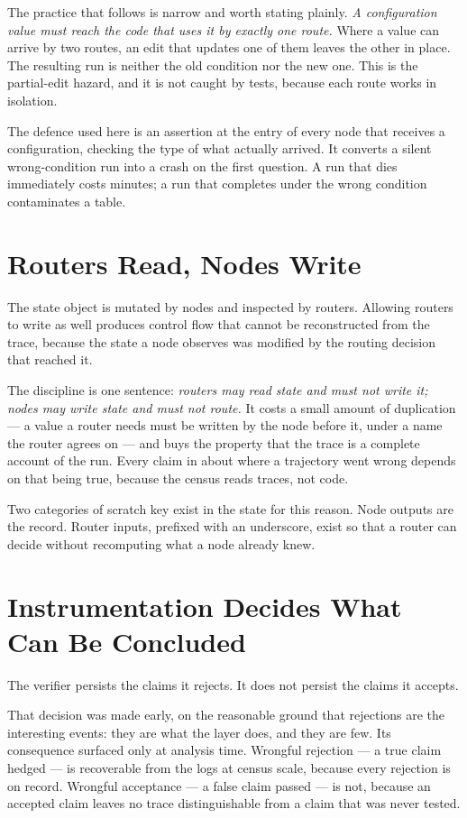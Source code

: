 The practice that follows is narrow and worth stating plainly. \emph{A
configuration value must reach the code that uses it by exactly one route.}
Where a value can arrive by two routes, an edit that updates one of them leaves
the other in place. The resulting run is neither the old condition nor the
new one. This is the partial-edit hazard, and it is not caught by tests, because
each route works in isolation.

The defence used here is an assertion at the entry of every node that receives a
configuration, checking the type of what actually arrived. It converts a silent
wrong-condition run into a crash on the first question. A run that dies
immediately costs minutes; a run that completes under the wrong condition
contaminates a table.

\section{Routers Read, Nodes Write}\label{app:state-discipline}

The state object is mutated by nodes and inspected by routers. Allowing routers
to write as well produces control flow that cannot be reconstructed from the
trace, because the state a node observes was modified by the routing decision
that reached it.

The discipline is one sentence: \emph{routers may read state and must not write
it; nodes may write state and must not route.} It costs a small amount of
duplication --- a value a router needs must be written by the node before it,
under a name the router agrees on --- and buys the property that the trace is a
complete account of the run. Every claim in  about where
a trajectory went wrong depends on that being true, because the census reads
traces, not code.

Two categories of scratch key exist in the state for this reason. Node outputs
are the record. Router inputs, prefixed with an underscore, exist so that a
router can decide without recomputing what a node already knew.

\section{Instrumentation Decides What Can Be
Concluded}\label{app:instrumentation-gap}

The verifier persists the claims it rejects. It does not persist the claims it
accepts.

That decision was made early, on the reasonable ground that rejections are the
interesting events: they are what the layer does, and they are few. Its
consequence surfaced only at analysis time. Wrongful rejection --- a true claim
hedged --- is recoverable from the logs at census scale, because every rejection
is on record. Wrongful acceptance --- a false claim passed --- is not, because
an accepted claim leaves no trace distinguishable from a claim that was never
tested.

